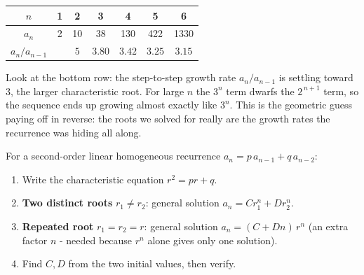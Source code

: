 \documentclass[11pt,a4paper]{article}
\begin{document}
\begin{center}
\end{center}

\begin{center}
\small
\begin{tabular}{@{}c|cccccc@{}}
\toprule
$n$ & 1 & 2 & 3 & 4 & 5 & 6\\
\midrule
$a_n$ & 2 & 10 & 38 & 130 & 422 & 1330\\
$a_n/a_{n-1}$ & & $5$ & $3.80$ & $3.42$ & $3.25$ & $3.15$\\
\bottomrule
\end{tabular}
\end{center}

\smallskip
Look at the bottom row: the step-to-step growth rate $a_n/a_{n-1}$ is settling toward $3$,
the larger characteristic root. For large $n$ the $3^n$ term dwarfs the $2^{\,n+1}$ term, so
the sequence ends up growing almost exactly like $3^n$. This is the geometric guess paying
off in reverse: the roots we solved for really are the growth rates the recurrence was
hiding all along.

\begin{methodbox}
For a second-order linear homogeneous recurrence $a_n=p\,a_{n-1}+q\,a_{n-2}$:
\begin{enumerate}[leftmargin=1.5em,itemsep=1pt]
  \item Write the characteristic equation $r^2=pr+q$.
  \item \textbf{Two distinct roots} $r_1\neq r_2$: general solution $a_n=C r_1^n+D r_2^n$.
  \item \textbf{Repeated root} $r_1=r_2=r$: general solution $a_n=(C+Dn)\,r^n$
        (an extra factor $n$ - needed because $r^n$ alone gives only one solution).
  \item Find $C,D$ from the two initial values, then verify.
\end{enumerate}
\end{methodbox}
\end{document}

